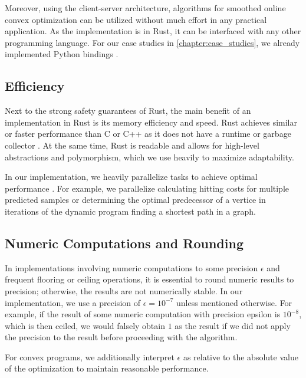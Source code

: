 Moreover, using the client-server architecture, algorithms for smoothed online convex optimization can be utilized without much effort in any practical application. As the implementation is in Rust, it can be interfaced with any other programming language. For our case studies in \autoref{chapter:case_studies}, we already implemented Python bindings \cite{Hübotter2021_3}.

\subsection{Efficiency}

Next to the strong safety guarantees of Rust, the main benefit of an implementation in Rust is its memory efficiency and speed. Rust achieves similar or faster performance than C or C++ as it does not have a runtime or garbage collector \cite{Rust, Perkel2020}. At the same time, Rust is readable and allows for high-level abstractions and polymorphism, which we use heavily to maximize adaptability.

In our implementation, we heavily parallelize tasks to achieve optimal performance \cite{Matsakis2015}. For example, we parallelize calculating hitting costs for multiple predicted samples or determining the optimal predecessor of a vertice in iterations of the dynamic program finding a shortest path in a graph.

\subsection{Numeric Computations and Rounding}

In implementations involving numeric computations to some precision $\epsilon$ and frequent flooring or ceiling operations, it is essential to round numeric results to precision; otherwise, the results are not numerically stable. In our implementation, we use a precision of $\epsilon = 10^{-7}$ unless mentioned otherwise. For example, if the result of some numeric computation with precision epsilon is $10^{-8}$, which is then ceiled, we would falsely obtain $1$ as the result if we did not apply the precision to the result before proceeding with the algorithm.

For convex programs, we additionally interpret $\epsilon$ as relative to the absolute value of the optimization to maintain reasonable performance.
